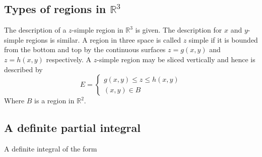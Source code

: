 \documentclass[14pt]{article}
\begin{document}
    \subsection{Types of regions in $\mathbb{R}^3$}
    The description of a $z$-simple region in $\mathbb{R}^3$ is given. The description for $x$ and $y$-simple regions is similar.
    A region in three space is called $z$ simple if it is bounded from the bottom and top by the continuous surfaces $z=g(x,y)$ and $z=h(x,y)$ respectively. A $z$-simple region may be sliced vertically and hence is described by 
    $$E=\left\{\begin{array}{lr}
        g(x,y)\leq z\leq h(x,y)\\
        (x,y)\in B
    \end{array}\right.$$
    Where $B$ is a region in $\mathbb{R}^2$.
    \subsection{A definite partial integral}
    A definite integral of the form 
\end{document}
